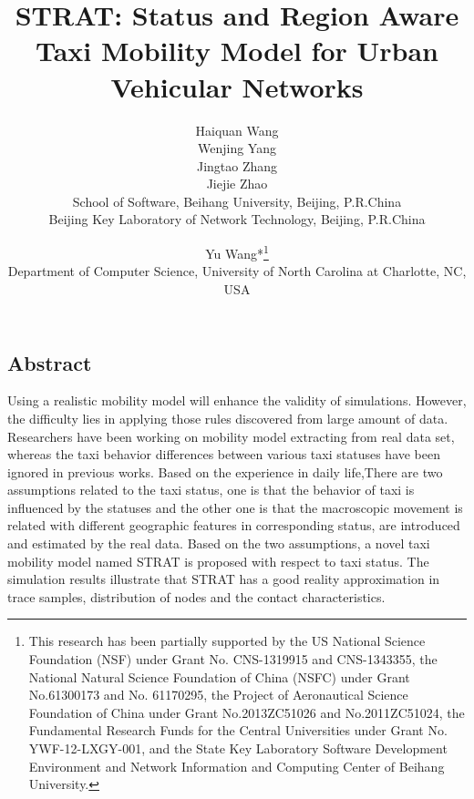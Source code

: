 \documentclass[camera-ready,twocolumn,10pt]{IEEEtran}
\begin{document}

\title{\Large \bf STRAT: Status and Region Aware Taxi Mobility Model for Urban Vehicular Networks}

\author{
{\rm Haiquan Wang}\\
{\rm Wenjing Yang}\\
{\rm Jingtao Zhang}\\
{\rm Jiejie Zhao}\\
School of Software, Beihang University, Beijing, P.R.China\\
Beijing Key Laboratory of Network Technology, Beijing, P.R.China\\
\and
{\rm Yu Wang*\thanks{
 This research has been partially supported by the US National Science Foundation (NSF) under Grant No. CNS-1319915 and CNS-1343355, the National Natural Science Foundation of China (NSFC) under Grant No.61300173 and No. 61170295, the Project of Aeronautical Science Foundation of China under Grant No.2013ZC51026 and No.2011ZC51024, the Fundamental Research Funds for the Central Universities under Grant No. YWF-12-LXGY-001, and the State Key Laboratory Software Development Environment and Network Information and Computing Center of Beihang University.}}\\
Department of Computer Science, University of North Carolina at Charlotte, NC, USA\\
}
\maketitle


\subsection*{Abstract}
Using a realistic mobility model will enhance the validity of simulations. However, the difficulty lies in applying those rules discovered from large amount of data. Researchers have been working on mobility model extracting from real data set, whereas the taxi behavior differences between various taxi statuses have been ignored in previous works.
Based on the experience in daily life,There are two assumptions related to the taxi status, one is that the behavior of taxi is influenced by the statuses and the other one is that the macroscopic movement is related with different geographic features in corresponding status, are introduced and estimated by the real data. Based on the two assumptions, a novel taxi mobility model named STRAT is proposed with respect to taxi status. The simulation results illustrate that STRAT has a good reality approximation in trace samples, distribution of nodes and the contact characteristics.
\end{document}
